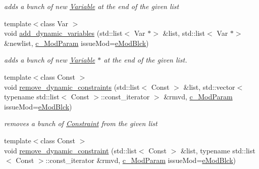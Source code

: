 \begin{Indent}
\begin{DoxyCompactItemize}
\begin{DoxyCompactList}\small\item\em adds a bunch of new \mbox{\hyperlink{class_s_m_spp__di__unipi__it_1_1_variable}{Variable}} at the end of the given list \end{DoxyCompactList}\item 
{\footnotesize template$<$class Var $>$ }\\void \mbox{\hyperlink{class_s_m_spp__di__unipi__it_1_1_block_a0f706ade0e807e37f00e1d49d5e23707}{add\+\_\+dynamic\+\_\+variables}} (std\+::list$<$ Var $\ast$$>$ \&list, std\+::list$<$ Var $\ast$$>$ \&newlist, \mbox{\hyperlink{group___modification___t_y_p_e_s_ga544246d8c462e9a2d817c2c30797968f}{c\+\_\+\+Mod\+Param}} issue\+Mod=\mbox{\hyperlink{group___modification___t_y_p_e_s_gga48fddcdd03a03f49b7e389ca1ed938d4a21b14b26b1c0093a0905f6fc010bad29}{e\+Mod\+Blck}})
\begin{DoxyCompactList}\small\item\em adds a bunch of new \mbox{\hyperlink{class_s_m_spp__di__unipi__it_1_1_variable}{Variable}} $\ast$ at the end of the given list. \end{DoxyCompactList}\item 
{\footnotesize template$<$class Const $>$ }\\void \mbox{\hyperlink{class_s_m_spp__di__unipi__it_1_1_block_a70a454edfce317205e2b0e65823a8322}{remove\+\_\+dynamic\+\_\+constraints}} (std\+::list$<$ Const $>$ \&list, std\+::vector$<$ typename std\+::list$<$ Const $>$\+::const\+\_\+iterator $>$ \&rmvd, \mbox{\hyperlink{group___modification___t_y_p_e_s_ga544246d8c462e9a2d817c2c30797968f}{c\+\_\+\+Mod\+Param}} issue\+Mod=\mbox{\hyperlink{group___modification___t_y_p_e_s_gga48fddcdd03a03f49b7e389ca1ed938d4a21b14b26b1c0093a0905f6fc010bad29}{e\+Mod\+Blck}})
\begin{DoxyCompactList}\small\item\em removes a bunch of \mbox{\hyperlink{class_s_m_spp__di__unipi__it_1_1_constraint}{Constraint}} from the given list \end{DoxyCompactList}\item 
\mbox{\label{class_s_m_spp__di__unipi__it_1_1_block_aff10c74f47c37fa9c70f5609a025d3a1}} 
{\footnotesize template$<$class Const $>$ }\\void \mbox{\hyperlink{class_s_m_spp__di__unipi__it_1_1_block_aff10c74f47c37fa9c70f5609a025d3a1}{remove\+\_\+dynamic\+\_\+constraint}} (std\+::list$<$ Const $>$ \&list, typename std\+::list$<$ Const $>$\+::const\+\_\+iterator \&rmvd, \mbox{\hyperlink{group___modification___t_y_p_e_s_ga544246d8c462e9a2d817c2c30797968f}{c\+\_\+\+Mod\+Param}} issue\+Mod=\mbox{\hyperlink{group___modification___t_y_p_e_s_gga48fddcdd03a03f49b7e389ca1ed938d4a21b14b26b1c0093a0905f6fc010bad29}{e\+Mod\+Blck}})

\end{DoxyCompactItemize}
\end{Indent}
